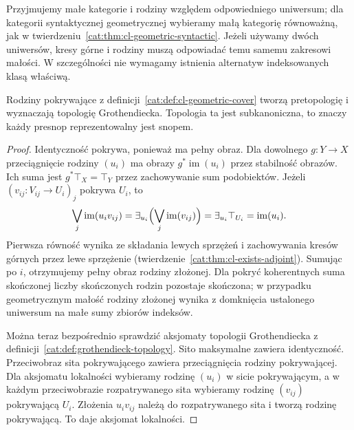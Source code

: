 Przyjmujemy małe kategorie i rodziny względem odpowiedniego uniwersum; dla kategorii syntaktycznej geometrycznej wybieramy małą kategorię równoważną, jak w twierdzeniu~\ref{cat:thm:cl-geometric-syntactic}. Jeżeli używamy dwóch uniwersów, kresy górne i rodziny muszą odpowiadać temu samemu zakresowi małości. W szczególności nie wymagamy istnienia alternatyw indeksowanych klasą właściwą.

\begin{twierdzenie}\label{cat:thm:cl-syntactic-topology}
Rodziny pokrywające z definicji~\ref{cat:def:cl-geometric-cover} tworzą pretopologię i wyznaczają topologię Grothendiecka. Topologia ta jest subkanoniczna, to znaczy każdy presnop reprezentowalny jest snopem.
\end{twierdzenie}
\begin{proof}
Identyczność pokrywa, ponieważ ma pełny obraz. Dla dowolnego $g:Y\to X$ przeciągnięcie rodziny $(u_i)$ ma obrazy $g^*\operatorname{im}(u_i)$ przez stabilność obrazów. Ich suma jest $g^*\top_X=\top_Y$ przez zachowywanie sum podobiektów. Jeżeli $(v_{ij}:V_{ij}\to U_i)_j$ pokrywa $U_i$, to
\[
 \bigvee_j\operatorname{im}(u_iv_{ij})
 =\exists_{u_i}\Bigl(\bigvee_j\operatorname{im}(v_{ij})\Bigr)
 =\exists_{u_i}\top_{U_i}
 =\operatorname{im}(u_i).
\]
Pierwsza równość wynika ze składania lewych sprzężeń i zachowywania kresów górnych przez lewe sprzężenie (twierdzenie~\ref{cat:thm:cl-exists-adjoint}). Sumując po $i$, otrzymujemy pełny obraz rodziny złożonej. Dla pokryć koherentnych suma skończonej liczby skończonych rodzin pozostaje skończona; w przypadku geometrycznym małość rodziny złożonej wynika z domknięcia ustalonego uniwersum na małe sumy zbiorów indeksów.

Można teraz bezpośrednio sprawdzić aksjomaty topologii Grothendiecka z definicji~\ref{cat:def:grothendieck-topology}. Sito maksymalne zawiera identyczność. Przeciwobraz sita pokrywającego zawiera przeciągnięcia rodziny pokrywającej. Dla aksjomatu lokalności wybieramy rodzinę $(u_i)$ w sicie pokrywającym, a w każdym przeciwobrazie rozpatrywanego sita wybieramy rodzinę $(v_{ij})$ pokrywającą $U_i$. Złożenia $u_iv_{ij}$ należą do rozpatrywanego sita i tworzą rodzinę pokrywającą. To daje aksjomat lokalności.


\end{proof}
